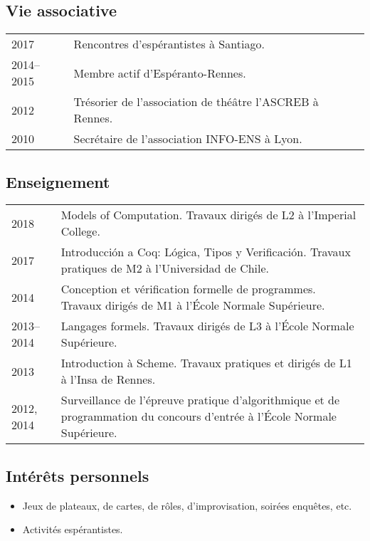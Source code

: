 \documentclass[12pt,a4paper]{article}
\makeatletter
\newcommand{\en}[1]{\foreignlanguage{english}{{#1}}}
\newcommand{\es}[1]{\foreignlanguage{spanish}{{#1}}}
\newcommand{\en}[1]{\foreignlanguage{english}{{#1}}}
\newcommand{\es}[1]{\foreignlanguage{spanish}{{#1}}}
\newenvironment{datecvsection}[1]%
               {\subsection*{#1}%
                 \noindent \begin{tabular}{@{}p{\annee}p{\texte}@{}}}
               {\end{tabular}}
\newenvironment{itemcvsection}[1]%
               {\subsection*{#1}\begin{itemize}}
               {\end{itemize}}
\newcommand\placeName{}
\makeatother
\begin{document}
\begin{datecvsection}{Vie associative}

    2017 & Rencontres d’espérantistes à \placeName{Santiago}. \\
    2014–2015 & Membre actif d’{Espéranto-Rennes}. \\
	2012 & Trésorier de l’association de théâtre l’{ASCREB} à \placeName{Rennes}. \\
    2010 & Secrétaire de l’association \textsc{INFO-ENS} à \placeName{Lyon}. \\

\end{datecvsection}

\begin{datecvsection}{Enseignement}

    2018 & Models of Computation. Travaux dirigés de L2 à l’\en{\placeName{Imperial College}}. \\

    2017 & Introducción a Coq: Lógica, Tipos y Verificación. Travaux pratiques de M2 à l’\es{\placeName{Universidad de Chile}}. \\

    2014 & Conception et vérification formelle de programmes. Travaux dirigés de M1 à l’\placeName{École Normale Supérieure}. \\

    2013–2014 & Langages formels. Travaux dirigés de L3 à l’\placeName{École Normale Supérieure}. \\

    2013 & Introduction à Scheme. Travaux pratiques et dirigés de L1 à l’\placeName{Insa} de \placeName{Rennes}. \\

    2012, 2014 & Surveillance de l’épreuve pratique d’algorithmique et de programmation du concours d’entrée à l’\placeName{École Normale Supérieure}.

\end{datecvsection}

\begin{itemcvsection}{Intérêts personnels}

  \item Jeux de plateaux, de cartes, de rôles, d’improvisation, soirées enquêtes, etc.
  \item Activités espérantistes.

\end{itemcvsection}
\end{document}
